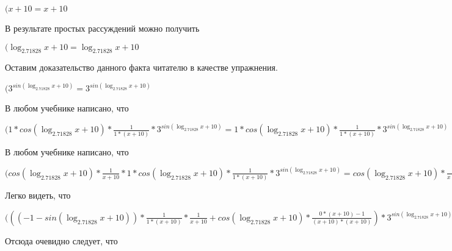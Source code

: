 \documentclass[12pt,a4paper,fleqn]{article}
\theoremstyle{definition}
\begin{document}
$( x  +  10  =  x  +  10 $

В результате простых рассуждений можно получить

$(\log_{ 2.71828 }{ x  +  10 } = \log_{ 2.71828 }{ x  +  10 }$

Оставим доказательство данного факта читателю в качестве упражнения.

$({ 3 }^{sin(\log_{ 2.71828 }{ x  +  10 })} = { 3 }^{sin(\log_{ 2.71828 }{ x  +  10 })}$

В любом учебнике написано, что

$( 1  * cos(\log_{ 2.71828 }{ x  +  10 }) * \frac{ 1 }{ 1  * ( x  +  10 )}
 * { 3 }^{sin(\log_{ 2.71828 }{ x  +  10 })} =  1  * cos(\log_{ 2.71828 }{ x  +  10 }) * \frac{ 1 }{ 1  * ( x  +  10 )}
 * { 3 }^{sin(\log_{ 2.71828 }{ x  +  10 })}$

В любом учебнике написано, что

$(cos(\log_{ 2.71828 }{ x  +  10 }) * \frac{ 1 }{ x  +  10 }
 *  1  * cos(\log_{ 2.71828 }{ x  +  10 }) * \frac{ 1 }{ 1  * ( x  +  10 )}
 * { 3 }^{sin(\log_{ 2.71828 }{ x  +  10 })} = cos(\log_{ 2.71828 }{ x  +  10 }) * \frac{ 1 }{ x  +  10 }
 *  1  * cos(\log_{ 2.71828 }{ x  +  10 }) * \frac{ 1 }{ 1  * ( x  +  10 )}
 * { 3 }^{sin(\log_{ 2.71828 }{ x  +  10 })}$

Легко видеть, что

$((( -1  - sin(\log_{ 2.71828 }{ x  +  10 })) * \frac{ 1 }{ 1  * ( x  +  10 )}
 * \frac{ 1 }{ x  +  10 }
 + cos(\log_{ 2.71828 }{ x  +  10 }) * \frac{ 0  * ( x  +  10 ) -  1 }{( x  +  10 ) * ( x  +  10 )}
) * { 3 }^{sin(\log_{ 2.71828 }{ x  +  10 })} + cos(\log_{ 2.71828 }{ x  +  10 }) * \frac{ 1 }{ x  +  10 }
 *  1  * cos(\log_{ 2.71828 }{ x  +  10 }) * \frac{ 1 }{ 1  * ( x  +  10 )}
 * { 3 }^{sin(\log_{ 2.71828 }{ x  +  10 })} = (( -1  - sin(\log_{ 2.71828 }{ x  +  10 })) * \frac{ 1 }{ 1  * ( x  +  10 )}
 * \frac{ 1 }{ x  +  10 }
 + cos(\log_{ 2.71828 }{ x  +  10 }) * \frac{ 0  * ( x  +  10 ) -  1 }{( x  +  10 ) * ( x  +  10 )}
) * { 3 }^{sin(\log_{ 2.71828 }{ x  +  10 })} + cos(\log_{ 2.71828 }{ x  +  10 }) * \frac{ 1 }{ x  +  10 }
 *  1  * cos(\log_{ 2.71828 }{ x  +  10 }) * \frac{ 1 }{ 1  * ( x  +  10 )}
 * { 3 }^{sin(\log_{ 2.71828 }{ x  +  10 })}$

Отсюда очевидно следует, что
\end{document}
